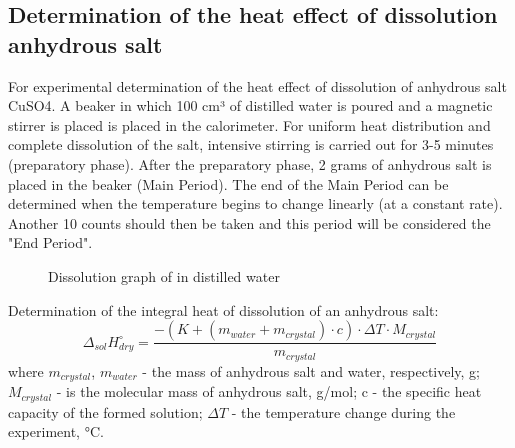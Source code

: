 \documentclass[12pt, letterpaper]{article}
\begin{document}
        \subsection{Determination of the heat effect of dissolution
anhydrous salt }
        For experimental determination of the heat effect of dissolution of anhydrous salt CuSO4. A beaker in which 100 cm³ of distilled water is poured and a magnetic stirrer is placed is placed in the calorimeter. For uniform heat distribution and complete dissolution of the salt, intensive stirring is carried out for 3-5 minutes (preparatory phase). After the preparatory phase, 2 grams of anhydrous salt is placed in the beaker (Main Period). The end of the Main Period can be determined when the temperature begins to change linearly (at a constant rate). Another 10 counts should then be taken and this period will be considered the "End Period".
        \begin{figure}[h]
            \centering
            \caption{Dissolution graph of  in distilled water}
        \end{figure}
        Determination of the integral heat of dissolution of an anhydrous salt: 
        \begin{equation}
            \Delta_{sol}H^\circ_{dry} = \frac{-(K + (m_{water} + m_{crystal}) \cdot c) \cdot \Delta T \cdot M_{crystal}}{m_{crystal}}
        \end{equation}
        where $ m_{crystal}$, $m_{water}$ - the mass of anhydrous salt and water, respectively, g; $M_{crystal}$ - is the molecular mass of anhydrous salt, g/mol; c - the specific heat capacity of the formed solution; $\Delta T$ - the temperature change during the experiment, °C. \\
\end{document}

